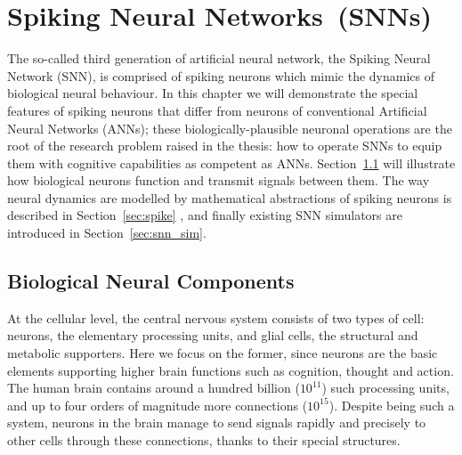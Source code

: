 \chapter{Spiking Neural Networks~(SNNs)}
\label{cha:bkg}
The so-called third generation of artificial neural network, the Spiking Neural Network (SNN), is comprised of spiking neurons which mimic the dynamics of biological neural behaviour.
In this chapter we will demonstrate the special features of spiking neurons that differ from neurons of conventional Artificial Neural Networks (ANNs);
these biologically-plausible neuronal operations are the root of the research problem raised in the thesis: how to operate SNNs to equip them with cognitive capabilities as competent as ANNs.
Section~\ref{sec:bio_neuron} will illustrate how biological neurons function and transmit signals between them.
The way neural dynamics are modelled by mathematical abstractions of spiking neurons is described in Section~\ref{sec:spike} , and finally existing SNN simulators are introduced in Section~\ref{sec:snn_sim}.

\section{Biological Neural Components}
\label{sec:bio_neuron}
At the cellular level, the central nervous system consists of two types of cell: neurons, the elementary processing units, and glial cells, the structural and metabolic supporters. 
Here we focus on the former, since neurons are the basic elements supporting higher brain functions such as cognition, thought and action. %
The human brain contains around a hundred billion ($10^{11}$) such processing units, and up to four orders of magnitude more connections ($10^{15}$)\DIFdelbegin {}\DIFdelend \DIFaddbegin {}\DIFaddend .
Despite being such a \DIFdelbegin {}\DIFdelend \DIFaddbegin {}\DIFaddend system, neurons in the brain manage to send signals rapidly and precisely to other cells through these connections, thanks to their special structures.
